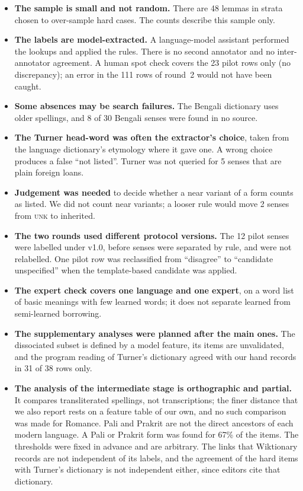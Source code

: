 \documentclass[11pt]{article}
\newcommand{\lbl}[1]{\textsc{#1}}
\begin{document}
\begin{itemize}
\item \textbf{The sample is small and not random.} There are 48 lemmas in strata chosen to over-sample hard cases. The counts describe this sample only.
\item \textbf{The labels are model-extracted.} A language-model assistant performed the lookups and applied the rules. There is no second annotator and no inter-annotator agreement. A human spot check covers the 23 pilot rows only (no discrepancy); an error in the 111 rows of round~2 would not have been caught.
\item \textbf{Some absences may be search failures.} The Bengali dictionary uses older spellings, and 8 of 30 Bengali senses were found in no source.
\item \textbf{The Turner head-word was often the extractor's choice}, taken from the language dictionary's etymology where it gave one. A wrong choice produces a false ``not listed''. Turner was not queried for 5 senses that are plain foreign loans.
\item \textbf{Judgement was needed} to decide whether a near variant of a form counts as listed. We did not count near variants; a looser rule would move 2 senses from \lbl{unk} to inherited.
\item \textbf{The two rounds used different protocol versions.} The 12 pilot senses were labelled under v1.0, before senses were separated by rule, and were not relabelled. One pilot row was reclassified from ``disagree'' to ``candidate unspecified'' when the template-based candidate was applied.
\item \textbf{The expert check covers one language and one expert}, on a word list of basic meanings with few learned words; it does not separate learned from semi-learned borrowing.
\item \textbf{The supplementary analyses were planned after the main ones.} The dissociated subset is defined by a model feature, its items are unvalidated, and the program reading of Turner's dictionary agreed with our hand records in 31 of 38 rows only.
\item \textbf{The analysis of the intermediate stage is orthographic and partial.} It compares transliterated spellings, not transcriptions; the finer distance that we also report rests on a feature table of our own, and no such comparison was made for Romance. Pali and Prakrit are not the direct ancestors of each modern language. A Pali or Prakrit form was found for 67\% of the items. The thresholds were fixed in advance and are arbitrary. The links that Wiktionary records are not independent of its labels, and the agreement of the hard items with Turner's dictionary is not independent either, since editors cite that dictionary.

\end{itemize}
\end{document}
